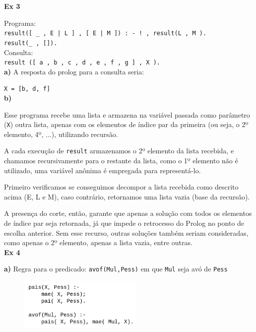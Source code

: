 \documentclass{article}
\begin{document}
    \newpage

    \textbf{Ex 3}

    Programa:\\
    \texttt{result([ \_ , E | L ] , [ E | M ]) : - ! , result(L , M ).\\
    result(\_ , []).}\\

    Consulta:\\
    \texttt{result ([ a , b , c , d , e , f , g ] , X ).}\\

    \textbf{a)} A resposta do prolog para a consulta seria:

    \texttt{X = [b, d, f]}\\

    \textbf{b)} 

    Esse programa recebe uma lista e armazena na variável passada como parâmetro (\texttt{X}) outra lista, 
    apenas com os elementos de índice par da primeira (ou seja, o 2º elemento,
    4º, ...), utilizando recursão.

    A cada execução de \texttt{result} armazenamos o 2º elemento da lista recebida, e chamamos
    recursivamente para o restante da lista, como o 1º elemento não é 
    utilizado, uma variável anônima é empregada para representá-lo.

    Primeiro verificamos se conseguimos decompor a lista recebida como
    descrito acima (E, L e M),
    caso contrário, retornamos uma lista vazia (base da recursão).

    A presença do corte, então, garante que apenas a solução com todos
    os elementos de índice par seja retornada, já que impede o retrocesso
    do Prolog no ponto de escolha anterior. Sem esse recurso, outras soluções também
    seriam consideradas, como apenas o 2º elemento, apenas a lista vazia, entre outras.\\


    \textbf{Ex 4}

    \textbf{a)} Regra para o predicado: \texttt{avof(Mul,Pess)} em que \texttt{Mul} seja avó de \texttt{Pess}

    \begin{figure}[H]
        \centering
        \includegraphics[width=6cm]{img/4a.png}
    \end{figure}
\end{document}
